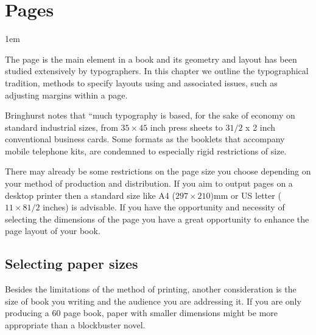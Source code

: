 \makeatletter
\newenvironment{adjustmargins}[2]{%
 \begin{list}{}{%
 \topsep\z@%
 \listparindent\parindent%
 \parsep\parskip%
 \checkoddpage
 \ifoddpage %
 \@ifmtarg{#1}{\setlength{\leftmargin}{\z@}}%
 {\setlength{\leftmargin}{#1}}%
 \@ifmtarg{#2}{\setlength{\rightmargin}{\z@}}%
 {\setlength{\rightmargin}{#2}}%
 \else %
 \@ifmtarg{#2}{\setlength{\leftmargin}{\z@}}%
 {\setlength{\leftmargin}{#2}}%
 \@ifmtarg{#1}{\setlength{\rightmargin}{\z@}}%
 {\setlength{\rightmargin}{#1}}%
\fi
}
\item[]}{\end{list}}

\makeatother


\chapter{Pages}

\parindent1em

The page is the main element in a book and its geometry and layout has been studied extensively by typographers. In this chapter we outline the typographical tradition, methods to specify layouts using \latex and associated issues, such as adjusting margins within a page.

Bringhurst notes that ``much typography is based, for the sake of economy on standard industrial sizes, from $35\times45$ inch press sheets to $3 1/2$ x 2 inch conventional business cards. Some formats as the booklets that accompany mobile telephone kits, are condemned to especially rigid restrictions of size.  

There may already be some restrictions on the page size you choose depending on your method of production and distribution. If you aim to output pages on a desktop printer then a standard size like A4 ($297\times210$)mm or US letter ($11\times 8 1/2$ inches) is advisable. If you have the opportunity and necessity of selecting the dimensions of the page you have a great opportunity to enhance the page layout of your book.

\section{Selecting  paper sizes}

Besides the limitations of the method of printing, another consideration is the size of book you writing and the
audience you are addressing it. If you are only producing a 60 page book, paper with smaller dimensions might be more appropriate than a blockbuster novel. 

